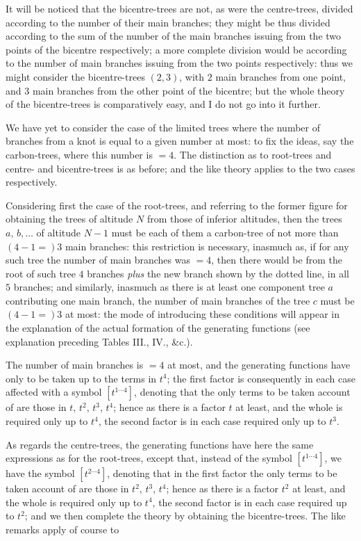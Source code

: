 \documentclass[11pt,a4paper]{article}
\begin{document}
It will be noticed that the bicentre-trees are not, as were the centre-trees, divided according to the number of their main branches; they might be thus divided according to the sum of the number of the main branches issuing from the two points of the bicentre respectively; a more complete division would be according to the number of main branches issuing from the two points respectively: thus we might consider the bicentre-trees $(2,3)$, with $2$ main branches from one point, and $3$ main branches from the other point of the bicentre; but the whole theory of the bicentre-trees is comparatively easy, and I do not go into it further.

We have yet to consider the case of the limited trees where the number of branches from a knot is equal to a given number at most: to fix the ideas, say the carbon-trees, where this number is $=4$. The distinction as to root-trees and centre- and bicentre-trees is as before; and the like theory applies to the two cases respectively.

Considering first the case of the root-trees, and referring to the former figure for obtaining the trees of altitude $N$ from those of inferior altitudes, then the trees $a,\,b,\ldots$ of altitude $N-1$ must be each of them a carbon-tree of not more than $(4-1=)3$ main branches: this restriction is necessary, inasmuch as, if for any such tree the number of main branches was $=4$, then there would be from the root of such tree $4$ branches \emph{plus} the new branch shown by the dotted line, in all $5$ branches; and similarly, inasmuch as there is at least one component tree $a$ contributing one main branch, the number of main branches of the tree $c$ must be $(4-1=)3$ at most: the mode of introducing these conditions will appear in the explanation of the actual formation of the generating functions (see explanation preceding Tables III., IV., \&c.).

The number of main branches is $=4$ at most, and the generating functions have only to be taken up to the terms in $t^{4}$; the first factor is consequently in each case affected with a symbol $[t^{1\cdots4}]$, denoting that the only terms to be taken account of are those in $t,\,t^{2},\,t^{3},\,t^{4}$; hence as there is a factor $t$ at least, and the whole is required only up to $t^{4}$, the second factor is in each case required only up to $t^{3}$.

As regards the centre-trees, the generating functions have here the same expressions as for the root-trees, except that, instead of the symbol $[t^{1\cdots4}]$, we have the symbol $[t^{2\cdots4}]$, denoting that in the first factor the only terms to be taken account of are those in $t^{2},\,t^{3},\,t^{4}$; hence as there is a factor $t^{2}$ at least, and the whole is required only up to $t^{4}$, the second factor is in each case required up to $t^{2}$; and we then complete the theory by obtaining the bicentre-trees. The like remarks apply of course to
\end{document}
